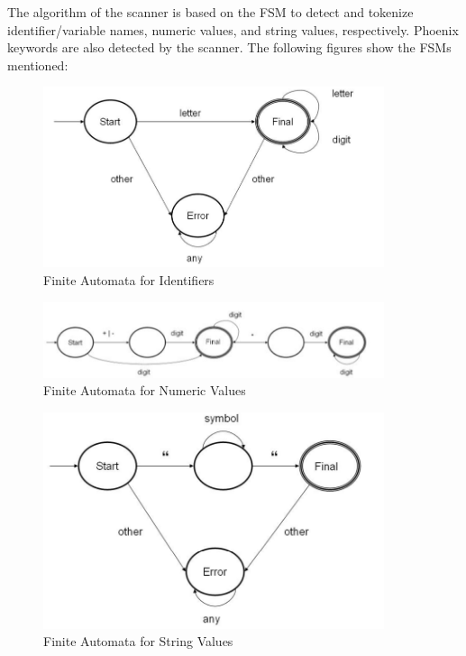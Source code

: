 The algorithm of the scanner is based on the \ac{FSM} to detect and tokenize identifier/variable names, numeric values, and string values, respectively. Phoenix keywords are also detected by the scanner. The following figures show the FSMs mentioned:

\begin{figure}[H]
\centering
\includegraphics[width=10cm]{ch2-images/phoenix.png}
\caption{Finite Automata for Identifiers \cite{bassil2019phoenix}}
\label{fig:Finite Automata for Identifiers}
\end{figure}

\begin{figure}[H]
\centering
\includegraphics[width=10cm]{ch2-images/phoenix2.png}
\caption{Finite Automata for Numeric Values \cite{bassil2019phoenix}}
\label{fig:Finite Automata for Numeric Values}
\end{figure}

\begin{figure}[H]
\centering
\includegraphics[width=10cm]{ch2-images/phoenix3.png}
\caption{Finite Automata for String Values \cite{bassil2019phoenix}}
\label{fig:Finite Automata for String Values}
\end{figure}

